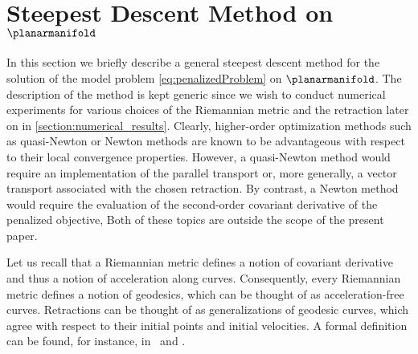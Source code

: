 \section{Steepest Descent Method on \texorpdfstring{$\planarmanifold$}{the Manifold of Planar Triangular Meshes}}
\label{section:steepest_descent_method}

In this section we briefly describe a general steepest descent method for the solution of the model problem \eqref{eq:penalizedProblem} on $\planarmanifold$.
The description of the method is kept generic since we wish to conduct numerical experiments for various choices of the Riemannian metric and the retraction later on in \cref{section:numerical_results}.
Clearly, higher-order optimization methods such as quasi-Newton or Newton methods are known to be advantageous with respect to their local convergence properties.
However, a quasi-Newton method would require an implementation of the parallel transport or, more generally, a vector transport associated with the chosen retraction.
By contrast, a Newton method would require the evaluation of the second-order covariant derivative of the penalized objective,
Both of these topics are outside the scope of the present paper.

Let us recall that a Riemannian metric defines a notion of covariant derivative and thus a notion of acceleration along curves.
Consequently, every Riemannian metric defines a notion of geodesics, which can be thought of as acceleration-free curves.
Retractions can be thought of as generalizations of geodesic curves, which agree with respect to their initial points and initial velocities.
A formal definition can be found, for instance, in~\cite[Definition~4.1.1]{AbsilMahonySepulchre:2008:1} and \cite[Definition~3.47]{Boumal:2023:1}.

